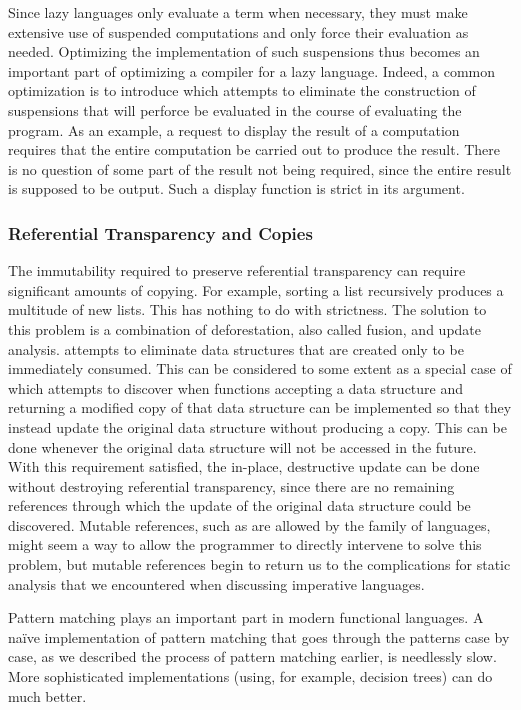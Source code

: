 Since lazy languages only evaluate a term when necessary, they must make extensive use of suspended computations and only force their evaluation as needed. Optimizing the implementation of such suspensions thus becomes an important part of optimizing a compiler for a lazy language. Indeed, a common optimization is to introduce  which attempts to eliminate the construction of suspensions that will perforce be evaluated in the course of evaluating the program. As an example, a request to display the result of a computation requires that the entire computation be carried out to produce the result. There is no question of some part of the result not being required, since the entire result is supposed to be output. Such a display function is strict in its argument.

\subsubsection{Referential Transparency and Copies}
The immutability required to preserve referential transparency can require significant amounts of copying. For example, sorting a list recursively produces a multitude of new lists. This has nothing to do with strictness. The solution to this problem is a combination of deforestation, also called fusion, and update analysis.  attempts to eliminate  data structures that are created only to be immediately consumed. This can be considered to some extent as a special case of  which attempts to discover when functions accepting a data structure and returning a modified copy of that data structure can be implemented so that they instead update the original data structure without producing a copy. This can be done whenever the original data structure will not be accessed in the future. With this requirement satisfied, the in-place, destructive update can be done without destroying referential transparency, since there are no remaining references through which the update of the original data structure could be discovered. Mutable references, such as are allowed by the \ML family of languages, might seem a way to allow the programmer to directly intervene to solve this problem, but mutable references begin to return us to the complications for static analysis that we encountered when discussing imperative languages.

Pattern matching plays an important part in modern functional languages. A na{\"i}ve implementation of pattern matching that goes through the patterns case by case, as we described the process of pattern matching earlier, is needlessly slow. More sophisticated implementations (using, for example, decision trees) can do much better.

